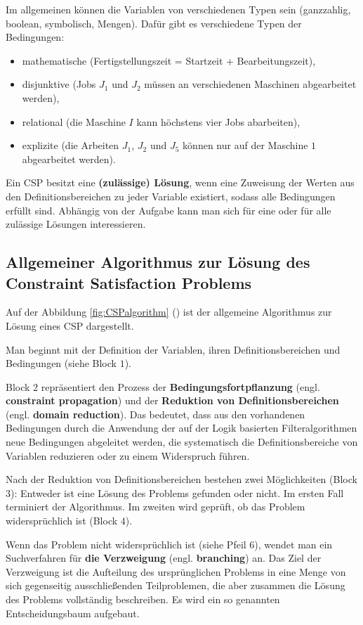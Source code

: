 Im allgemeinen können die Variablen von verschiedenen Typen sein (ganzzahlig, boolean, symbolisch, Mengen). Dafür gibt es verschiedene Typen der Bedingungen:
\begin{itemize}
	\setlength{\itemsep}{0pt}
	\item mathematische (Fertigstellungszeit = Startzeit + Bearbeitungszeit),
	\item disjunktive (Jobs $J_1$ und $J_2$ müssen an verschiedenen Maschinen abgearbeitet werden),
	\item relational (die Maschine $I$ kann höchstens vier Jobs abarbeiten),
	\item explizite (die Arbeiten $J_1$, $J_2$ und $J_5$ können nur auf der Maschine $1$ abgearbeitet werden).
\end{itemize}
Ein CSP besitzt eine {\bf (zulässige) Lösung}, wenn eine Zuweisung der Werten aus den  Definitionsbereichen zu jeder Variable existiert, sodass alle Bedingungen erfüllt sind. Abhängig von der Aufgabe kann man sich für eine oder für alle zulässige Lösungen interessieren.

\subsection{Allgemeiner Algorithmus zur Lösung des Constraint Satisfaction Problems}

Auf der Abbildung \ref{fig:CSPalgorithm} (\cite{CPforScheduling}) ist der allgemeine Algorithmus zur Lösung eines CSP dargestellt. 

Man beginnt mit der Definition der Variablen, ihren Definitionsbereichen und Bedingungen %
(siehe Block $1$).

Block $2$ repräsentiert den Prozess der {\bf Bedingungsfortpflanzung} (engl. {\bf constraint propagation}) und der {\bf Reduktion von Definitionsbereichen} (engl. {\bf domain reduction}).  Das bedeutet, dass aus den vorhandenen Bedingungen durch die Anwendung der auf der Logik basierten Filteralgorithmen neue Bedingungen abgeleitet werden, die systematisch die Definitionsbereiche von Variablen reduzieren oder zu einem Widerspruch führen.

Nach der Reduktion von Definitionsbereichen bestehen zwei Möglichkeiten (Block $3$): Entweder ist eine Lösung des Problems gefunden oder nicht. Im ersten Fall terminiert der Algorithmus. Im zweiten wird geprüft, ob das Problem widersprüchlich ist (Block $4$).

Wenn das Problem nicht widersprüchlich ist (siehe Pfeil $6$), wendet man ein Suchverfahren für {\bf die Verzweigung} (engl. {\bf branching}) an. Das Ziel der Verzweigung ist die Aufteilung des ursprünglichen Problems in eine Menge von sich gegenseitig ausschließenden Teilproblemen, die aber zusammen die Lösung des Problems vollständig beschreiben. Es wird ein so genannten Entscheidungsbaum aufgebaut.

